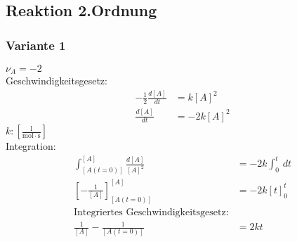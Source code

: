 \documentclass[a4paper, fleqn]{article}
\begin{document}
\subsection{Reaktion 2.Ordnung}
\subsubsection{Variante 1}
   $\nu_A = -2$\\
Geschwindigkeitsgesetz:\\
\begin{align*}
    -\frac{1}{2}\frac{d[A]}{dt} &= k[A]^2\\
    \frac{d[A]}{dt} &= -2 k [A]^2
\end{align*}
$k: [\mathrm{\frac{l}{mol\cdot s}}]$\\
Integration:
\begin{align*}
    \int_{[A(t=0)]}^{[A]} \frac{d[A]}{[A]^2} &= - 2k \int_{0}^{t} \, dt\\
    \left[-\frac{1}{[A]}\right]^{[A]}_{[A(t=0)]} &= -2k[t]_0^t\\
    \text{Integriertes Geschwindigkeitsgesetz:}\\
    \frac{1}{[A]} - \frac{1}{[A(t=0)]} &= 2kt\\
\end{align*}
\end{document}
